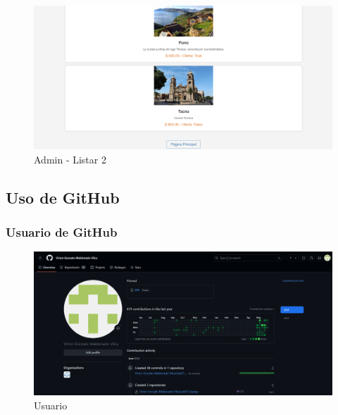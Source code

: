 \documentclass{article}
\begin{document}
  \newpage
  \begin{figure}[H]
    \centering
    \includegraphics[width=1\textwidth, keepaspectratio]{img/ejecucion9.png}
    \caption{Admin - Listar 2}
  \end{figure}
  
	
  \subsection{Uso de GitHub}
  

	\subsubsection{Usuario de GitHub}
  \begin{figure}[H]
    \centering
    \includegraphics[width=1\textwidth, keepaspectratio]{img/usuario.png}
    \caption{Usuario}
  \end{figure}
  \newpage
  
\end{document}
